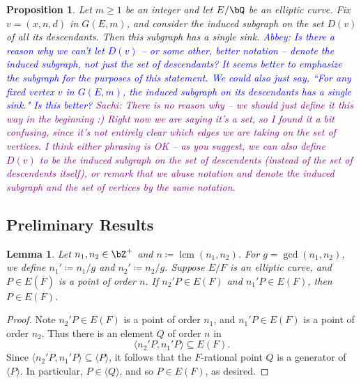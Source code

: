 \documentclass[11pt,reqno]{amsart}
\theoremstyle{plain}
\newtheorem{lemma}[theorem]{Lemma}
\newtheorem{proposition}[theorem]{Proposition}
\theoremstyle{definition}
\DeclareMathOperator{\lcm}{lcm}
\newcommand{\Q}{\bQ}
\newcommand{\Z}{\bZ}
\newcommand{\abbey}[1]{\textcolor{blue}{Abbey: #1}}
\newcommand{\sachi}[1]{\textcolor{purple}{Sachi: #1}}
\newcommand{\sedit}[1]{{\color{purple} #1}}
\begin{document}
\begin{proposition}\label{Prop:single_sink}
    Let $m\geq 1$ be an integer and let $E/\Q$ be an elliptic curve. Fix $v=(x,n,d)$ in $G(E,m)$, and consider the \sedit{induced} subgraph \sedit{on the set} $D(v)$ of all its descendants. Then \sedit{this subgraph} has a single sink. \abbey{Is there a reason why we can't let $D(v)$ -- or some other, better notation -- denote the induced subgraph, not just the set of descendants? It seems better to emphasize the subgraph for the purposes of this statement. We could also just say, ``For any fixed vertex $v$ in $G(E,m)$, the induced subgraph on its descendants has a single sink." Is this better?} \sachi{There is no reason why -- we should just define it this way in the beginning :) Right now we are saying it's a set, so I found it a bit confusing, since it's not entirely clear which edges we are taking on the set of vertices. I think either phrasing is OK -- as you suggest, we can also define $D(v)$ to be the induced subgraph on the set of descendents (instead of the set of descendents itself), or remark that we abuse notation and denote the induced subgraph and the set of vertices by the same notation.}
\end{proposition}

\subsection{Preliminary Results}

\begin{lemma}\label{lem:LCM}
Let $n_1,n_2 \in \Z^+$ and $n \coloneqq \lcm(n_1,n_2)$. For $g=\gcd(n_1,n_2)$, we define $n_1'\coloneqq n_1/g$ and $n_2'\coloneqq n_2/g$. 
Suppose $E/F$ is an elliptic curve, and $P \in E(\overline{F})$ is a point of order $n$. If $n_2'P\in E(F)$ and $n_1'P \in E(F)$, then $P \in E(F)$.
\end{lemma}

\begin{proof}
Note $n_2'P \in E(F)$ is a point of order $n_1$, and $n_1'P \in E(F)$ is a point of order $n_2$.  Thus there is an element $Q$ of order $n$ in
\[
\langle n_2'P, n_1' P \rangle \subseteq E(F).
\] Since $\langle n_2'P, n_1' P \rangle \subseteq \langle P \rangle$, it follows that the $F$-rational point $Q$ is a generator of $\langle P \rangle$. In particular, $P\in \langle Q \rangle$, and so $P\in E(F)$, as desired.
\end{proof}
\end{document}
